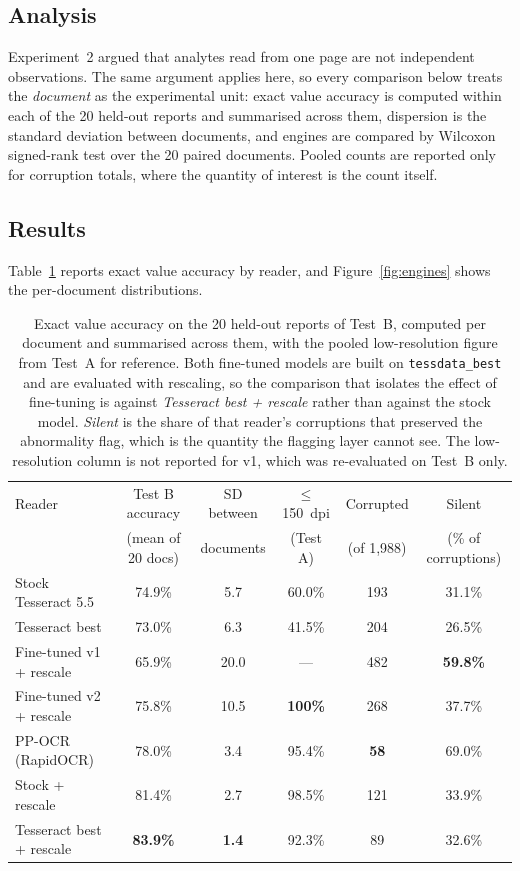 \documentclass[11pt]{article}
\begin{document}
\subsection{Analysis}

Experiment~2 argued that analytes read from one page are not independent observations. The same
argument applies here, so every comparison below treats the \emph{document} as the experimental
unit: exact value accuracy is computed within each of the 20 held-out reports and summarised
across them, dispersion is the standard deviation between documents, and engines are compared by
Wilcoxon signed-rank test over the 20 paired documents. Pooled counts are reported only for
corruption totals, where the quantity of interest is the count itself.

\subsection{Results}

Table~\ref{tab:engines} reports exact value accuracy by reader, and Figure~\ref{fig:engines}
shows the per-document distributions.

\begin{table}[t]
\centering
\caption{Exact value accuracy on the 20 held-out reports of Test~B, computed per document and
summarised across them, with the pooled low-resolution figure from Test~A for reference. Both
fine-tuned models are built on \texttt{tessdata\_best} and are evaluated with rescaling, so the
comparison that isolates the effect of fine-tuning is against \emph{Tesseract best + rescale}
rather than against the stock model. \emph{Silent} is the share of that reader's corruptions
that preserved the abnormality flag, which is the quantity the flagging layer cannot see. The
low-resolution column is not reported for v1, which was re-evaluated on Test~B only.}
\label{tab:engines}
\small
\begin{tabular}{lccccc}
\toprule
Reader & Test B accuracy & SD between & $\leq$150~dpi & Corrupted & Silent \\
       & (mean of 20 docs) & documents & (Test A) & (of 1{,}988) & (\% of corruptions) \\
\midrule
Stock Tesseract 5.5      & 74.9\% & \phantom{0}5.7 & 60.0\% & 193 & 31.1\% \\
Tesseract best           & 73.0\% & \phantom{0}6.3 & 41.5\% & 204 & 26.5\% \\
Fine-tuned v1 + rescale  & 65.9\% & 20.0 & --- & 482 & \textbf{59.8\%} \\
Fine-tuned v2 + rescale  & 75.8\% & 10.5 & \textbf{100\%} & 268 & 37.7\% \\
PP-OCR (RapidOCR)        & 78.0\% & \phantom{0}3.4 & 95.4\% & \textbf{\phantom{0}58} & 69.0\% \\
Stock + rescale          & 81.4\% & \phantom{0}2.7 & 98.5\% & 121 & 33.9\% \\
Tesseract best + rescale & \textbf{83.9\%} & \textbf{\phantom{0}1.4} & 92.3\% & \phantom{0}89 & 32.6\% \\
\bottomrule
\end{tabular}
\end{table}
\end{document}
